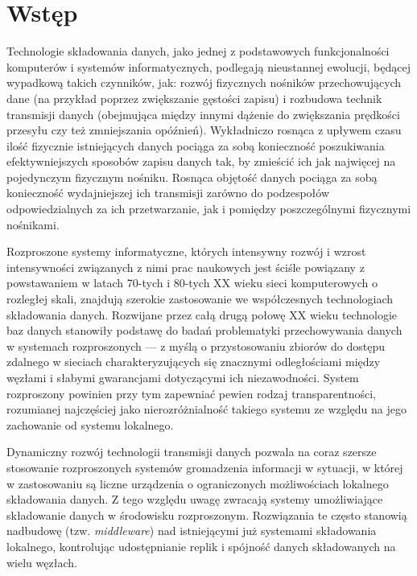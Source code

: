 \chapter{Wstęp} \label{chapter:intro}

Technologie składowania danych, jako jednej z podstawowych funkcjonalności komputerów i systemów informatycznych, podlegają nieustannej ewolucji, będącej wypadkową takich czynników, jak: rozwój fizycznych nośników przechowujących dane (na przykład poprzez zwiększanie gęstości zapisu) i rozbudowa technik transmisji danych (obejmująca między innymi dążenie do zwiększania prędkości przesyłu czy też zmniejszania opóźnień). Wykładniczo rosnąca z upływem czasu ilość fizycznie istniejących danych pociąga za sobą konieczność poszukiwania efektywniejszych sposobów zapisu danych tak, by zmieścić ich jak najwięcej na pojedynczym fizycznym nośniku. Rosnąca objętość danych pociąga za sobą konieczność wydajniejszej ich transmisji zarówno do podzespołów odpowiedzialnych za ich przetwarzanie, jak i pomiędzy poszczególnymi fizycznymi nośnikami.

Rozproszone systemy informatyczne, których intensywny rozwój i wzrost intensywności związanych z nimi prac naukowych jest ściśle powiązany z powstawaniem w latach 70-tych i 80-tych XX wieku sieci komputerowych o rozległej skali, znajdują szerokie zastosowanie we współczesnych technologiach składowania danych. Rozwijane przez całą drugą połowę XX wieku technologie baz danych stanowiły podstawę do badań problematyki przechowywania danych w systemach rozproszonych --- z myślą o przystosowaniu zbiorów do dostępu zdalnego w sieciach charakteryzujących się znacznymi odległościami między węzłami i słabymi gwarancjami dotyczącymi ich niezawodności. System rozproszony powinien przy tym zapewniać pewien rodzaj transparentności, rozumianej najczęściej jako nierozróżnialność takiego systemu ze względu na jego zachowanie od systemu lokalnego.

Dynamiczny rozwój technologii transmisji danych pozwala na coraz szersze stosowanie rozproszonych systemów gromadzenia informacji w sytuacji, w której w zastosowaniu są liczne urządzenia o ograniczonych możliwościach lokalnego składowania danych. Z tego względu uwagę zwracają systemy umożliwiające składowanie danych w środowisku rozproszonym. Rozwiązania te często stanowią nadbudowę (tzw. \textit{middleware}) nad istniejącymi już systemami składowania lokalnego, kontrolując udostępnianie replik i spójność danych składowanych na wielu węzłach.


